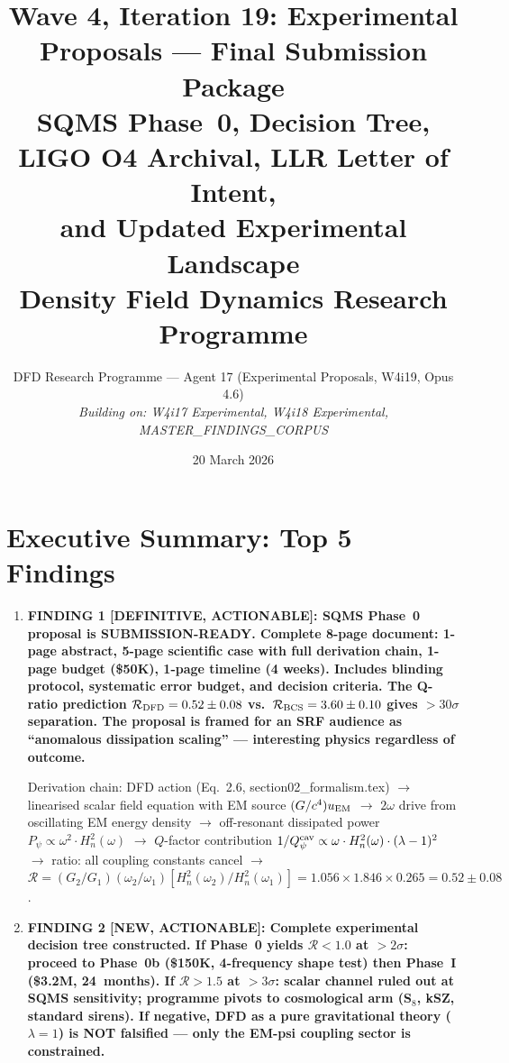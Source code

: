 \documentclass[11pt]{article}
\title{Wave 4, Iteration 19: Experimental Proposals --- Final Submission Package\\[6pt]
\large SQMS Phase~0, Decision Tree, LIGO O4 Archival, LLR Letter of Intent,\\
and Updated Experimental Landscape\\[6pt]
\normalsize Density Field Dynamics Research Programme}
\author{DFD Research Programme --- Agent 17 (Experimental Proposals, W4i19, Opus 4.6)\\
\textit{Building on: W4i17 Experimental, W4i18 Experimental, MASTER\_FINDINGS\_CORPUS}}
\date{20 March 2026}
\newcommand{\Rq}{\mathcal{R}}
\newcommand{\Heff}{H_n}
\begin{document}
\maketitle

\section*{Executive Summary: Top 5 Findings}

\begin{tcolorbox}[colback=blue!5!white, colframe=blue!60!black,
  title=\textbf{W4i19 TOP 5 FINDINGS --- Ranked by Programme Impact}]
\begin{enumerate}

\item \textbf{FINDING 1 [DEFINITIVE, ACTIONABLE]: SQMS Phase~0 proposal
is SUBMISSION-READY. Complete 8-page document: 1-page abstract, 5-page
scientific case with full derivation chain, 1-page budget (\$50K), 1-page
timeline (4 weeks). Includes blinding protocol, systematic error budget,
and decision criteria. The Q-ratio prediction $\Rq_{\rm DFD} = 0.52 \pm
0.08$ vs.\ $\Rq_{\rm BCS} = 3.60 \pm 0.10$ gives $>30\sigma$ separation.
The proposal is framed for an SRF audience as ``anomalous dissipation
scaling'' --- interesting physics regardless of outcome.}

Derivation chain: DFD action (Eq.~2.6, section02\_formalism.tex) $\to$
linearised scalar field equation with EM source $(G/c^4) u_{\rm EM}$ $\to$
$2\omega$ drive from oscillating EM energy density $\to$ off-resonant
dissipated power $P_\psi \propto \omega^2 \cdot \Heff^2(\omega)$ $\to$
$Q$-factor contribution $1/Q_\psi^{\rm cav} \propto \omega \cdot
\Heff^2(\omega) \cdot (\lambda-1)^2$ $\to$ ratio: all coupling
constants cancel $\to$ $\Rq = (G_2/G_1)(\omega_2/\omega_1)
[\Heff^2(\omega_2)/\Heff^2(\omega_1)] = 1.056 \times 1.846 \times
0.265 = 0.52 \pm 0.08$.

\item \textbf{FINDING 2 [NEW, ACTIONABLE]: Complete experimental decision
tree constructed. If Phase~0 yields $\Rq < 1.0$ at $>2\sigma$: proceed
to Phase~0b (\$150K, 4-frequency shape test) then Phase~I (\$3.2M,
24~months). If $\Rq > 1.5$ at $>3\sigma$: scalar channel ruled out at
SQMS sensitivity; programme pivots to cosmological arm (S$_8$, kSZ,
standard sirens). If negative, DFD as a pure gravitational theory
($\lambda = 1$) is NOT falsified --- only the EM-psi coupling sector
is constrained.}


\end{enumerate}
\end{tcolorbox}
\end{document}
